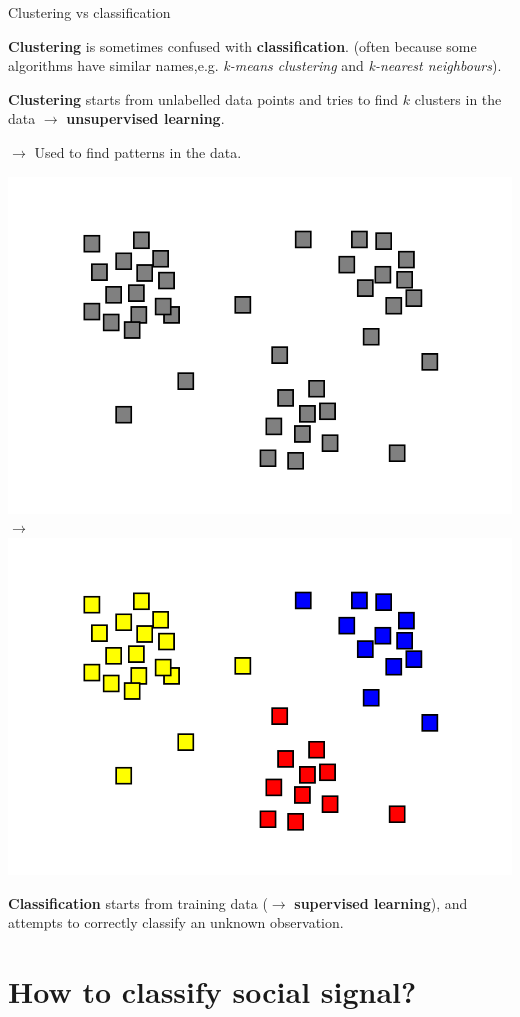 \documentclass[compress]{beamer}
\begin{document}
\begin{frame}{Clustering vs classification}

\textbf{Clustering} is sometimes confused with \textbf{classification}.  (often
    because some algorithms have similar names,e.g. \emph{k-means clustering}
    and \emph{k-nearest neighbours}).

\textbf{Clustering} starts from unlabelled data points and tries to find
    $k$ clusters in the data $\rightarrow$ \textbf{unsupervised learning}.


$\rightarrow$ Used to find patterns in the data.

    \begin{center}
        \includegraphics[width=0.3\linewidth]{clustering-0}
        $\rightarrow$
        \includegraphics[width=0.3\linewidth]{clustering-1}
    \end{center}


    \textbf{Classification} starts from training data ($\rightarrow$
    \textbf{supervised learning}), and attempts to correctly classify an
    unknown observation.

\end{frame}


\section[Classifying social signal]{How to classify social signal?}
\end{document}
